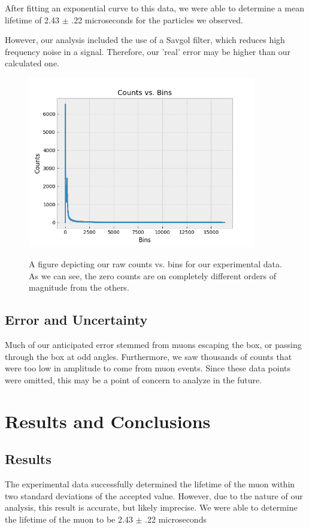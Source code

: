 \documentclass[10pt,letterpaper,onecolumn]{article}
\begin{document}
After fitting an exponential curve to this data, we were able to determine a mean lifetime of 2.43 $\pm$ .22 microseconds for the particles we observed.

However, our analysis included the use of a Savgol filter, which reduces high frequency noise in a signal. Therefore, our 'real' error may be higher than our calculated one.
\begin{figure}[hbt!]
    \begin{center}
        {{\includegraphics[width=10cm]{initData.png} }}%
        \caption{A figure depicting our raw counts vs. bins for our experimental data. As we can see, the zero counts are on completely different orders of magnitude from the others.}%
        \label{fig:init}%
    \end{center}
\end{figure}
\subsection{Error and Uncertainty}
Much of our anticipated error stemmed from muons escaping the box, or passing through the box at odd angles. Furthermore, we saw thousands of counts that were too low in amplitude to come from muon events. Since these data points were omitted, this may be a point of concern to analyze in the future.
\section{Results and Conclusions}
\subsection{Results}
The experimental data successfully determined the lifetime of the muon within two standard deviations of the accepted value. However, due to the nature of our analysis, this result is accurate, but likely imprecise. We were able to determine the lifetime of the muon to be 2.43 $\pm$ .22 microseconds
\end{document}
